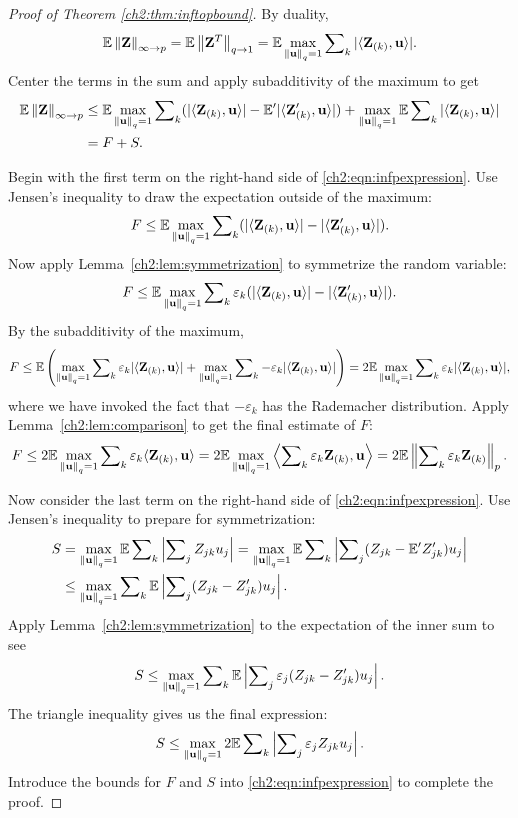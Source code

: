 \begin{proof}[Proof of Theorem \ref{ch2:thm:inftopbound}] 
By duality, 
\[
\mathbb{E}\left\|\mathbf{Z}\right\|_{\infty\rightarrow
p}=\mathbb{E}\left\|\mathbf{Z}^{T}\right\|_{q\rightarrow1}=\mathbb{E}\max_{\left\|\mathbf{u}\right\|_q = 1}\sum\nolimits
_{k}|\langle\mathbf{Z}_{(k)},\mathbf{u}\rangle|.
\]
Center the terms in the sum and apply subadditivity of the maximum to get
\begin{equation}
\begin{aligned}
\mathbb{E}\left\|\mathbf{Z}\right\|_{\infty\rightarrow p} &
\leq\mathbb{E}\max_{\left\|\mathbf{u}\right\|_q = 1}\sum\nolimits_{k}(|\langle\mathbf{Z}_{(k)},\mathbf{u}
\rangle|-\mathbb{E}^\prime|\langle\mathbf{Z}_{(k)}^\prime,\mathbf{u}
\rangle|)+\max_{\left\|\mathbf{u}\right\|_q = 1}\mathbb{E}\sum\nolimits_{k}|\langle\mathbf{Z}_{(k)},\mathbf{u}\rangle| \\
	& = F+S.
\end{aligned}
\label{ch2:eqn:infpexpression}
\end{equation}

Begin with the first term on the right-hand side of \eqref{ch2:eqn:infpexpression}. Use Jensen's inequality
to draw the expectation outside of the maximum: 
\[
F\leq\mathbb{E}\max_{\left\|\mathbf{u}\right\|_q = 1}\sum\nolimits_{k}(|\langle\mathbf{Z}_{(k)},\mathbf{u}
\rangle|-|\langle\mathbf{Z}_{(k)}^{\prime},\mathbf{u}\rangle|).
\]
Now apply Lemma~\ref{ch2:lem:symmetrization} to symmetrize the random
variable: 
\[
F\leq\mathbb{E}\max_{\left\|\mathbf{u}\right\|_q = 1}\sum\nolimits_{k}\varepsilon_{k}(|\langle\mathbf{Z}_{(k)},\mathbf{u}
\rangle|-|\langle\mathbf{Z}_{(k)}^{\prime},\mathbf{u}\rangle|).
\]
By the subadditivity of the maximum, \[
F\leq\mathbb{E}\left(\max_{\left\|\mathbf{u}\right\|_q = 1}\sum\nolimits_{k}\varepsilon_{k}|\langle\mathbf{Z}_{(k)},
\mathbf{u}\rangle|+\max_{\left\|\mathbf{u}\right\|_q = 1}\sum\nolimits_{k}-\varepsilon_{k}|\langle\mathbf{Z}_{(k)},
 \mathbf{u}\rangle|\right)=2\mathbb{E}\max_{\left\|\mathbf{u}\right\|_q = 1}\sum\nolimits_{k}\varepsilon_{k}
|\langle\mathbf{Z}_{(k)},\mathbf{u}\rangle|,
\]
where we have invoked the fact that $-\varepsilon_{k}$ has the Rademacher
distribution. Apply Lemma~\ref{ch2:lem:comparison} to get the final estimate
of $F$: 
\[
F\leq2\mathbb{E}\max_{\left\|\mathbf{u}\right\|_q = 1}\sum\nolimits_{k}\varepsilon_{k}\langle\mathbf{Z}_{(k)},\mathbf{u}
\rangle=2\mathbb{E}\max_{\left\|\mathbf{u}\right\|_q = 1}\left\langle
\sum\nolimits_{k}\varepsilon_{k}\mathbf{Z}_{(k)},\mathbf{u}\right\rangle
=2\mathbb{E}\left\|\sum\nolimits_{k}\varepsilon_{k}\mathbf{Z}_{(k)}\right\|_{p}.
\]

Now consider the last term on the right-hand side of \eqref{ch2:eqn:infpexpression}. Use Jensen's
inequality to prepare for symmetrization: 
\[
\begin{split}
S &
=\max_{\left\|\mathbf{u}\right\|_q = 1}\mathbb{E}\sum\nolimits_{k}\left|\sum\nolimits_{j}Z_{jk}u_{j}
\right|=\max_{\left\|\mathbf{u}\right\|_q = 1}\mathbb{E}\sum\nolimits_{k}\left|\sum\nolimits_{j}(Z_{jk}-\mathbb{E}^\prime
Z_{jk}^\prime)u_{j}\right|\\
 &
\leq\max_{\left\|\mathbf{u}\right\|_q = 1}\sum\nolimits_{k}\mathbb{E}\left|\sum\nolimits_{j}(Z_{jk}-Z_{jk}^{
\prime})u_{j}\right|.
\end{split}
\]
Apply Lemma~\ref{ch2:lem:symmetrization} to the expectation of the inner sum
to see
\[
S\leq\max_{\left\|\mathbf{u}\right\|_q = 1}\sum\nolimits_{k}\mathbb{E}\left|\sum\nolimits_{j}\varepsilon_{j}(Z_{
jk}-Z_{jk}^{\prime})u_{j}\right|.
\]
The triangle inequality gives us the final expression:
\[
S\leq\max_{\left\|\mathbf{u}\right\|_q = 1}2\mathbb{E}\sum\nolimits_{k}\left|\sum\nolimits_{j}\varepsilon_{j}Z_{
jk}u_{j}\right|.
\]
Introduce the bounds for $F$ and $S$ into \eqref{ch2:eqn:infpexpression} to complete
the proof.
\end{proof}

